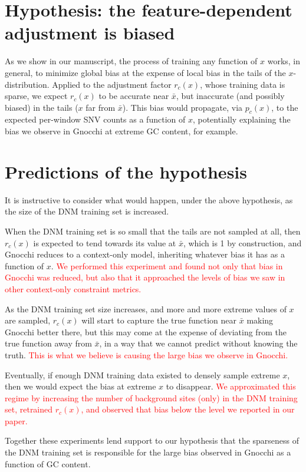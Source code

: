 \documentclass{article}
\begin{document}
\section{Hypothesis: the feature-dependent adjustment is biased}
As we show in our manuscript, 
the process of training any function of $x$ works, in general, to minimize 
global bias at the expense of local bias in the tails of the $x$-distribution. 
Applied to the adjustment factor $r_c(x)$, whose training data is sparse,
we expect $r_c(x)$ to be accurate near $\bar{x}$, but inaccurate (and possibly biased) 
in the tails ($x$ far from $\bar{x}$). 
This bias would propagate, via $p_c(x)$, to the expected per-window SNV counts as a function of $x$,
potentially explaining the bias we observe in Gnocchi at extreme GC content, for example.  

\section{Predictions of the hypothesis}
It is instructive to consider what would happen, under the above hypothesis, 
as the size of the DNM training set is increased. 

When the DNM training set is so small that the tails are not sampled at all, 
then $r_c(x)$ is expected to tend towards its value at $\bar{x}$, 
which is 1 by construction, 
and Gnocchi reduces to a context-only model, 
inheriting whatever bias it has as a function of $x$. 
\textcolor{red}{We performed this
experiment and found
not only that bias in Gnocchi was reduced, but
also that it approached the levels of bias we saw
in other context-only constraint metrics.}

As the DNM training set size increases, and more and more extreme 
values of $x$ are sampled, 
$r_c(x)$ will start to capture the true function near $\bar{x}$
making Gnocchi better there, 
but this may come at the expense of deviating from the true function away 
from $\bar{x}$, in a way that we cannot predict without knowing the truth. 
\textcolor{red}{This is what we believe is causing the 
large bias we observe in Gnocchi.}

Eventually, if enough DNM training data existed to densely sample extreme $x$, 
then we would expect the bias at extreme $x$ to disappear. 
\textcolor{red}{We approximated this regime by increasing the number of 
background 
sites (only) in the DNM training set, 
retrained $r_c(x)$, and observed that bias below 
the level we reported in our paper.}

Together these experiments lend support to our hypothesis that 
the sparseness of the DNM training set is responsible for the large bias 
observed in Gnocchi as a function of GC content. 
\end{document}
